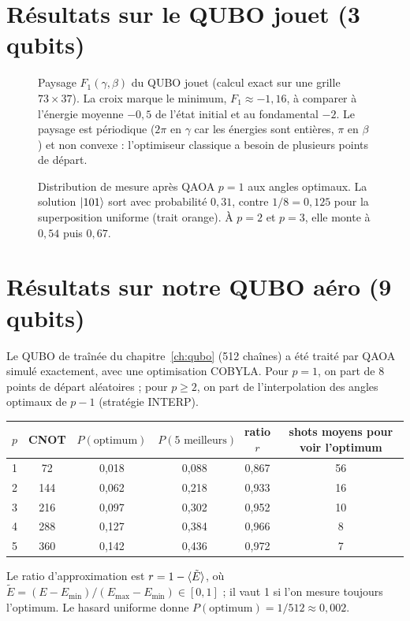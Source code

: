 \section{Résultats sur le QUBO jouet (3 qubits)}
\begin{figure}[htbp]
\centering

\caption{Paysage $F_1(\gamma,\beta)$ du QUBO jouet (calcul exact sur une grille $73\times37$). La croix marque le minimum, $F_1\approx-1{,}16$, à comparer à l'énergie moyenne $-0{,}5$ de l'état initial et au fondamental $-2$. Le paysage est périodique ($2\pi$ en $\gamma$ car les énergies sont entières, $\pi$ en $\beta$) et non convexe : l'optimiseur classique a besoin de plusieurs points de départ.}\label{fig:paysage-qaoa}
\end{figure}

\begin{figure}[htbp]
\centering

\caption{Distribution de mesure après QAOA $p=1$ aux angles optimaux. La solution $\lvert 101\rangle$ sort avec probabilité $0{,}31$, contre $1/8=0{,}125$ pour la superposition uniforme (trait orange). À $p=2$ et $p=3$, elle monte à $0{,}54$ puis $0{,}67$.}\label{fig:jouet-proba}
\end{figure}

\section{Résultats sur notre QUBO aéro (9 qubits)}
Le QUBO de traînée du chapitre~\ref{ch:qubo} (512 chaînes) a été traité par QAOA simulé exactement, avec une optimisation COBYLA. Pour $p=1$, on part de 8 points de départ aléatoires ; pour $p\ge2$, on part de l'interpolation des angles optimaux de $p-1$ (stratégie INTERP).

\begin{center}
\begin{tabular}{cccccc}
\toprule
$p$ & CNOT & $P(\text{optimum})$ & $P(\text{5 meilleurs})$ & ratio $r$ & shots moyens pour voir l'optimum\\
\midrule
1 & 72 & 0,018 & 0,088 & 0,867 & 56\\
2 & 144 & 0,062 & 0,218 & 0,933 & 16\\
3 & 216 & 0,097 & 0,302 & 0,952 & 10\\
4 & 288 & 0,127 & 0,384 & 0,966 & 8\\
5 & 360 & 0,142 & 0,436 & 0,972 & 7\\
\bottomrule
\end{tabular}
\end{center}
Le ratio d'approximation est $r=1-\langle \tilde E\rangle$, où $\tilde E=(E-E_{\min})/(E_{\max}-E_{\min})\in[0,1]$ ; il vaut 1 si l'on mesure toujours l'optimum. Le hasard uniforme donne $P(\text{optimum})=1/512\approx0{,}002$.

